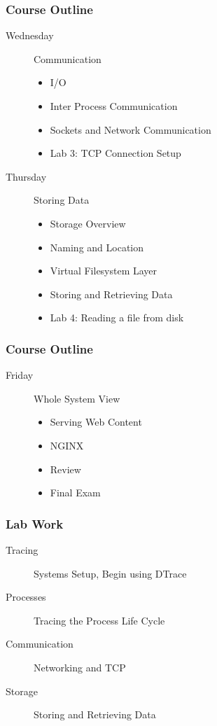 \documentclass[pdftex]{beamer} %
\begin{document}
\begin{frame}
  \frametitle{Course Outline}
  \begin{description}
  \item[Wednesday] Communication
    \begin{itemize}
    \item I/O
    \item Inter Process Communication
    \item Sockets and Network Communication
    \item Lab 3: TCP Connection Setup
    \end{itemize}
  \item[Thursday] Storing Data
    \begin{itemize}
    \item Storage Overview
    \item Naming and Location
    \item Virtual Filesystem Layer
    \item Storing and Retrieving Data
    \item Lab 4: Reading a file from disk
    \end{itemize}
  \end{description}
\end{frame}

\begin{frame}
  \frametitle{Course Outline}
  \begin{description}
  \item[Friday] Whole System View
    \begin{itemize}
    \item Serving Web Content
    \item NGINX
    \item Review
    \item Final Exam
    \end{itemize}
  \end{description}
\end{frame}

\begin{frame}
  \frametitle{Lab Work}
  \begin{description}
  \item [Tracing] Systems Setup, Begin using DTrace
  \item [Processes] Tracing the Process Life Cycle
  \item [Communication] Networking and TCP
  \item [Storage] Storing and Retrieving Data
  \end{description}
\end{frame}
\end{document}
